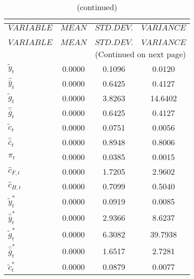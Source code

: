  
\begin{center}
\begin{longtable}{lccc} 
\caption{THEORETICAL MOMENTS}\\
 \label{Table:th_moments}\\
\toprule 
$VARIABLE             $	 & 	 $         MEAN$	 & 	 $    STD. DEV.$	 & 	 $     VARIANCE$\\
\midrule \endfirsthead 
\caption{(continued)}\\
 \toprule \\ 
$VARIABLE             $	 & 	 $         MEAN$	 & 	 $    STD. DEV.$	 & 	 $     VARIANCE$\\
\midrule \endhead 
\midrule \multicolumn{4}{r}{(Continued on next page)} \\ \bottomrule \endfoot 
\bottomrule \endlastfoot 
${\tilde y_t}         $	 & 	       0.0000	 & 	       0.1096	 & 	       0.0120 \\ 
${\hat {\bar y}_t}    $	 & 	       0.0000	 & 	       0.6425	 & 	       0.4127 \\ 
${\tilde g_t}         $	 & 	       0.0000	 & 	       3.8263	 & 	      14.6402 \\ 
${\hat {\bar g}_t}    $	 & 	       0.0000	 & 	       0.6425	 & 	       0.4127 \\ 
${\tilde c_t}         $	 & 	       0.0000	 & 	       0.0751	 & 	       0.0056 \\ 
${\hat {\bar c}_t}    $	 & 	       0.0000	 & 	       0.8948	 & 	       0.8006 \\ 
${\pi_t}              $	 & 	       0.0000	 & 	       0.0385	 & 	       0.0015 \\ 
${\hat c_{F,t}}       $	 & 	       0.0000	 & 	       1.7205	 & 	       2.9602 \\ 
${\hat c_{H,t}}       $	 & 	       0.0000	 & 	       0.7099	 & 	       0.5040 \\ 
${\tilde y_t^*}       $	 & 	       0.0000	 & 	       0.0919	 & 	       0.0085 \\ 
${\hat {\bar y}_t^*}  $	 & 	       0.0000	 & 	       2.9366	 & 	       8.6237 \\ 
${\tilde g_t^*}       $	 & 	       0.0000	 & 	       6.3082	 & 	      39.7938 \\ 
${\hat {\bar g}_t^*}  $	 & 	       0.0000	 & 	       1.6517	 & 	       2.7281 \\ 
${\tilde c_t^*}       $	 & 	       0.0000	 & 	       0.0879	 & 	       0.0077 \\ 

\end{longtable}
\end{center}
